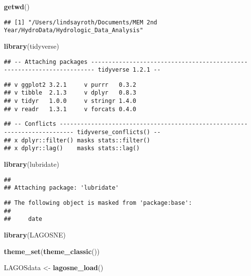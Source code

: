 \documentclass[]{article}
\newenvironment{Shaded}{\begin{snugshade}}{\end{snugshade}}
\newcommand{\KeywordTok}[1]{\textcolor[rgb]{0.13,0.29,0.53}{\textbf{#1}}}
\newcommand{\NormalTok}[1]{#1}
\newcommand{\StringTok}[1]{\textcolor[rgb]{0.31,0.60,0.02}{#1}}
\begin{document}
\begin{Shaded}
\begin{Highlighting}[]
\KeywordTok{getwd}\NormalTok{()}
\end{Highlighting}
\end{Shaded}

\begin{verbatim}
## [1] "/Users/lindsayroth/Documents/MEM 2nd Year/HydroData/Hydrologic_Data_Analysis"
\end{verbatim}

\begin{Shaded}
\begin{Highlighting}[]
\KeywordTok{library}\NormalTok{(tidyverse)}
\end{Highlighting}
\end{Shaded}

\begin{verbatim}
## -- Attaching packages ----------------------------------------------------------------------- tidyverse 1.2.1 --
\end{verbatim}

\begin{verbatim}
## v ggplot2 3.2.1     v purrr   0.3.2
## v tibble  2.1.3     v dplyr   0.8.3
## v tidyr   1.0.0     v stringr 1.4.0
## v readr   1.3.1     v forcats 0.4.0
\end{verbatim}

\begin{verbatim}
## -- Conflicts -------------------------------------------------------------------------- tidyverse_conflicts() --
## x dplyr::filter() masks stats::filter()
## x dplyr::lag()    masks stats::lag()
\end{verbatim}

\begin{Shaded}
\begin{Highlighting}[]
\KeywordTok{library}\NormalTok{(lubridate)}
\end{Highlighting}
\end{Shaded}

\begin{verbatim}
## 
## Attaching package: 'lubridate'
\end{verbatim}

\begin{verbatim}
## The following object is masked from 'package:base':
## 
##     date
\end{verbatim}

\begin{Shaded}
\begin{Highlighting}[]
\KeywordTok{library}\NormalTok{(LAGOSNE)}

\KeywordTok{theme_set}\NormalTok{(}\KeywordTok{theme_classic}\NormalTok{())}

\NormalTok{LAGOSdata <-}\StringTok{ }\KeywordTok{lagosne_load}\NormalTok{()}
\end{Highlighting}
\end{Shaded}
\end{document}
